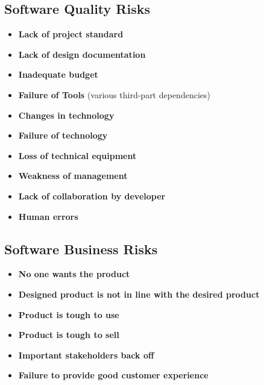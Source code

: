 \documentclass{article}
\begin{document}
\subsection{Software Quality Risks}
\begin{itemize}
    \item \textbf{Lack of project standard }
    \item \textbf{Lack of design documentation }
    \item \textbf{Inadequate budget}
    \item \textbf{Failure of Tools} (various third-part dependencies)
    \item \textbf{Changes in technology}
    \item \textbf{Failure of technology}
    \item \textbf{Loss of technical equipment}
    \item \textbf{Weakness of management}
    \item \textbf{Lack of collaboration by developer}
    \item \textbf{Human errors}
\end{itemize}

\subsection{Software Business Risks}
\begin{itemize}
    \item \textbf{No one wants the product}
    \item \textbf{Designed product is not in line with the desired product}
    \item \textbf{Product is tough to use}
    \item \textbf{Product is tough to sell}
    \item \textbf{Important stakeholders back off}
    \item \textbf{Failure to provide good customer experience}
\end{itemize}
\end{document}
